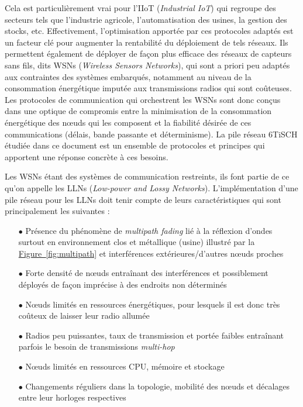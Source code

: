 \documentclass[]{report}
\newcommand{\wordlink}[2]{\hyperref[#2]{#1~\ref{#2}}}
\begin{document}
\par Cela est particulièrement vrai pour l'IIoT (\textit{Industrial IoT}) qui regroupe des secteurs tels que l'industrie agricole, l'automatisation des usines, la gestion des stocks, etc. Effectivement, l'optimisation apportée par ces protocoles adaptés est un facteur clé pour augmenter la rentabilité du déploiement de tels réseaux. Ils permettent également de déployer de façon plus efficace des réseaux de capteurs sans fils, dits WSNs (\textit{Wireless Sensors Networks}), qui sont a priori peu adaptés aux contraintes des systèmes embarqués, notamment au niveau de la consommation énergétique imputée aux transmissions radios qui sont coûteuses. Les protocoles de communication qui orchestrent les WSNs sont donc conçus dans une optique de compromis entre la minimisation de la consommation énergétique des nœuds qui les composent et la fiabilité désirée de ces communications (délais, bande passante et déterminisme). La pile réseau 6TiSCH étudiée dans ce document est un ensemble de protocoles et principes qui apportent une réponse concrète à ces besoins.\\

\par Les WSNs étant des systèmes de communication restreints, ils font partie de ce qu'on appelle les LLNs (\textit{Low-power and Lossy Networks}). L'implémentation d'une pile réseau pour les LLNs doit tenir compte de leurs caractéristiques qui sont principalement les suivantes :\\

\begin{itemize}
\item[$\bullet$] Présence du phénomène de \textit{multipath fading} lié à la réflexion d'ondes surtout en environnement clos et métallique (usine) illustré par la \wordlink{Figure}{fig:multipath} et interférences extérieures/d'autres nœuds proches
\vspace{0.2cm}
\item[$\bullet$] Forte densité de nœuds entraînant des interférences et possiblement déployés de façon imprécise à des endroits non déterminés
\vspace{0.2cm}
\item[$\bullet$] Nœuds limités en ressources énergétiques, pour lesquels il est donc très coûteux de laisser leur radio allumée
\vspace{0.2cm}
\item[$\bullet$] Radios peu puissantes, taux de transmission et portée faibles entraînant parfois le besoin de transmissions \textit{multi-hop}
\vspace{0.2cm}
\item[$\bullet$] Nœuds limités en ressources CPU, mémoire et stockage
\vspace{0.2cm}
\item[$\bullet$] Changements réguliers dans la topologie, mobilité des nœuds et décalages entre leur horloges respectives
\end{itemize}
~\\
\end{document}
